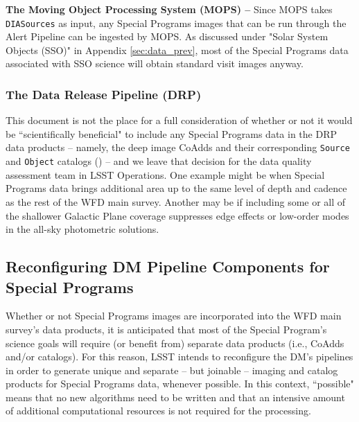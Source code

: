 \documentclass[DM,lsstdoc,toc]{lsstdoc}
\begin{document}
{\bf The Moving Object Processing System (MOPS) -- } Since MOPS takes \texttt{DIASources} as input, any Special Programs images that can be run through the Alert Pipeline can be ingested by MOPS. As discussed under "Solar System Objects (SSO)" in Appendix \ref{sec:data_prev}, most of the Special Programs data associated with SSO science will obtain standard visit images anyway. %

\subsubsection{The Data Release Pipeline (DRP)}\label{ssec:dmplans_drp}

This document is not the place for a full consideration of whether or not it would be ``scientifically beneficial" to include any Special Programs data in the DRP data products -- namely, the deep image CoAdds and their corresponding {\tt Source} and {\tt Object} catalogs () -- and we leave that decision for the data quality assessment team in LSST Operations. One example might be when Special Programs data brings additional area up to the same level of depth and cadence as the rest of the WFD main survey. Another may be if including some or all of the shallower Galactic Plane coverage suppresses edge effects or low-order modes in the all-sky photometric solutions.

\subsection{Reconfiguring DM Pipeline Components for Special Programs}\label{ssec:dmplans_reconfig}

Whether or not Special Programs images are incorporated into the WFD main survey's data products, it is anticipated that most of the Special Program's science goals will require (or benefit from) separate data products (i.e., CoAdds and/or catalogs). For this reason, LSST intends to reconfigure the DM's pipelines in order to generate unique and separate -- but joinable -- imaging and catalog products for Special Programs data, whenever possible. In this context, ``possible" means that no new algorithms need to be written and that an intensive amount of additional computational resources is not required for the processing.
\end{document}
